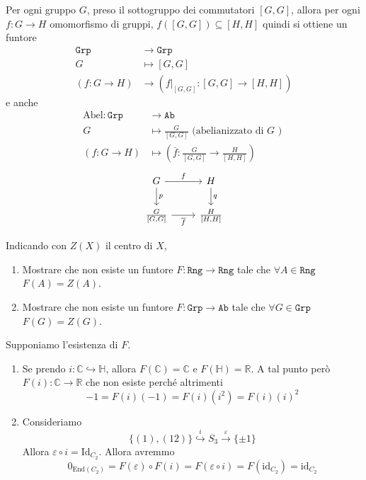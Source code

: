 \begin{example}{}
    Per ogni gruppo \(G\), preso il sottogruppo dei commutatori \([G, G]\),
    allora per ogni \(f : G \to H\) omomorfismo di gruppi, \(f{([G, G])} \subseteq [H, H] \) 
    quindi si ottiene un funtore
    \begin{align*}{}
        \mathtt{Grp} &\to \mathtt{Grp} \\
        G &\mapsto [G, G] \\
        {(f : G \to H)} &\to {(f |_{[G, G]} : [G, G] \to [H, H] )}
    \end{align*}
    e anche 
    \begin{align*}
        \mathrm{Abel} : \mathtt{Grp} &\to \mathtt{Ab} \\
        G &\mapsto \frac{G}{[G, G]} \text{ (abelianizzato di \(G\) ) } \\
        {(f : G \to H)} &\mapsto {\left(\overline{f} : \frac{G}{[G,G]} \to \frac{H}{[H,H]}\right)}
    \end{align*}
\[\begin{tikzcd}
	{G} & {H} \\
    {\frac{G}{[G,G]}} & {\frac{H}{[H,H]}}
	\arrow["f", from=1-1, to=1-2]
	\arrow["{p}", from=1-1, to=2-1]
	\arrow["{q}", from=1-2, to=2-2]
	\arrow["\overline{f}"', from=2-1, to=2-2]
\end{tikzcd}\]
\end{example}

\begin{eser}{}
    Indicando con \(Z{(X)}\) il centro di \(X\),

\begin{enumerate}[label = \alph*.]
    \item Mostrare che non esiste un funtore \(F : \mathtt{Rng} \to \mathtt{Rng}\) tale
    che \(\forall A \in \mathtt{Rng}\) \(F{(A)} = Z{(A)}\).
    \item Mostrare che non esiste un funtore \(F : \mathtt{Grp} \to \mathtt{Ab}\) tale
    che \(\forall G \in \mathtt{Grp}\) \(F{(G)} = Z{(G)}\).
\end{enumerate}
    \tcblower
    Supponiamo l'esistenza di \(F\).
\begin{enumerate}[label = \alph*.]
    \item Se prendo \(i : \mathbb{C} \hookrightarrow \mathbb{H}\),
        allora \(F{(\mathbb{C})} = \mathbb{C} \) e \(F{(\mathbb{H})} = \mathbb{R}\). A tal punto però \(
        F{(i)} : \mathbb{C} \to \mathbb{R}\) che non esiste perché altrimenti \[-1 = F{(i)}{(-1)} = F{(i)}{(i^2)} = F{(i)}{(i)}^2\]
    \item Consideriamo
        \[
          \{(1), (12)\} \overset{i}{\hookrightarrow } S_{3} \overset{\varepsilon}{\to } \{\pm 1\} 
        \]
        Allora \(\varepsilon \circ i = \mathrm{Id}_{C_{2}} \). Allora avremmo
        \[
          0_{\mathrm{End}{(C_{2})}}  = F{(\varepsilon)} \circ F{(i)} = F{(\varepsilon \circ i)} = F{(\mathrm{id}_{C_{2}})} = \mathrm{id}_{C_{2}}
        \]
\end{enumerate}

\end{eser}

